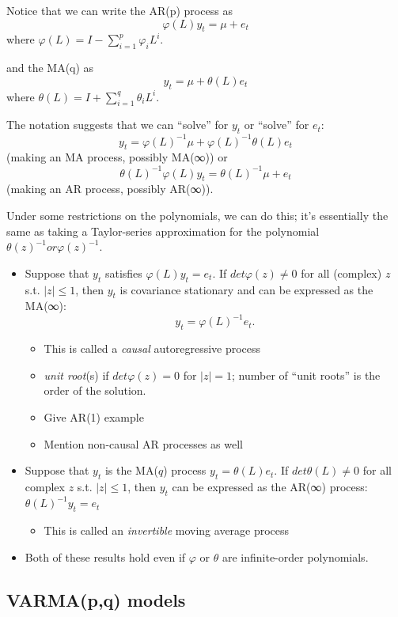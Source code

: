 Notice that we can write the AR(p) process as
\[φ(L) y_{t} = μ + e_t \]
where $φ(L) = I - \sum_{i=1}^p φ_i L^i$.

and the MA(q) as
\[y_t = μ + θ(L) e_t\]
where $θ(L) = I + \sum_{i=1}^q θ_i L^i$.

The notation suggests that we can ``solve'' for $y_t$ or ``solve'' for
$e_t$:
\[y_t = φ(L)^{-1} μ + φ(L)^{-1} θ(L) e_t\]
(making an MA process, possibly MA(∞)) or
\[θ(L)^{-1} φ(L) y_t = θ(L)^{-1} μ + e_t\]
(making an AR process, possibly AR(∞)).

Under some restrictions on the polynomials, we can do this; it's
essentially the same as taking a Taylor-series approximation for the
polynomial $θ(z)^{-1} or φ(z)^{-1}$.

\begin{itemize}
\item Suppose that $y_t$ satisfies $φ(L) y_t = e_t$. If $det φ(z) ≠ 0$
  for all (complex) $z$ s.t. $|z| ≤ 1$, then $y_t$ is covariance
  stationary and can be expressed as the MA(∞):
  \[y_t = φ(L)^{-1} e_t.\]
  \begin{itemize}
  \item This is called a \emph{causal} autoregressive process
  \item \emph{unit root}(s) if $det φ(z) = 0$ for $|z| = 1$; number of
    ``unit roots'' is the order of the solution.
  \item Give AR(1) example
  \item Mention non-causal AR processes as well
  \end{itemize}
\item Suppose that $y_t$ is the MA($q$) process $y_t = θ(L) e_t$. If
  $det θ(L) ≠ 0$ for all complex $z$ s.t. $|z| ≤ 1$, then $y_t$ can be
  expressed as the AR(∞) process: $θ(L)^{-1} y_t = e_t$

  \begin{itemize}
  \item This is called an \emph{invertible} moving average process
  \end{itemize}
\item Both of these results hold even if $φ$ or $θ$ are infinite-order
  polynomials.
\end{itemize}

\subsection{VARMA(p,q) models}


